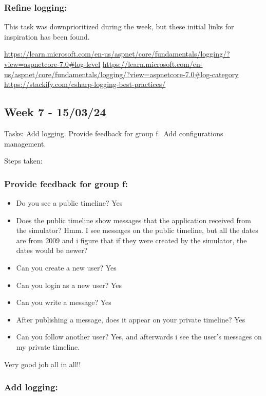 \subsubsection{Refine logging:}
\label{log:refine-logging}

This task was downprioritized during the week, but these initial links
for inspiration has been found.

\url{https://learn.microsoft.com/en-us/aspnet/core/fundamentals/logging/?view=aspnetcore-7.0\#log-level}
\url{https://learn.microsoft.com/en-us/aspnet/core/fundamentals/logging/?view=aspnetcore-7.0\#log-category}
\url{https://stackify.com/csharp-logging-best-practices/}

\subsection{Week 7 - 15/03/24}
\label{log:week7}

Tasks: Add logging. Provide feedback for group f.~Add configurations
management.

Steps taken:

\subsubsection{Provide feedback for group f:}
\label{log:provide-feedback-for-group-f}

\begin{itemize}
    \item Do you see a public timeline? Yes
    \item Does the public timeline show messages that the application received from the simulator? Hmm. I see messages on the public timeline, but all the dates are from 2009 and i figure that if they were created by the simulator, the dates would be newer?
    \item Can you create a new user? Yes
    \item Can you login as a new user? Yes
    \item Can you write a message? Yes
    \item After publishing a message, does it appear on your private timeline? Yes
    \item Can you follow another user? Yes, and afterwards i see the user's messages on my private timeline.
\end{itemize}

Very good job all in all!!

\subsubsection{Add logging:}
\label{log:add-logging}

